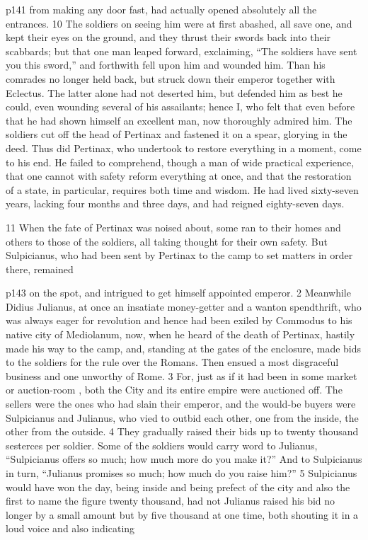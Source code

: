 p141 from making any door fast, had actually opened absolutely all the entrances.
10
The soldiers on seeing him were at first abashed, all save one, and kept their eyes on the ground, and they thrust their swords back into their scabbards; but that one man leaped forward, exclaiming, ``The soldiers have sent you this sword,'' and forthwith fell upon him and wounded him. Than his comrades no longer held back, but struck down their emperor together with Eclectus. The latter alone had not deserted him, but defended him as best he could, even wounding several of his assailants; hence I, who felt that even before that he had shown himself an excellent man, now thoroughly admired him. The soldiers cut off the head of Pertinax and fastened it on a spear, glorying in the deed. Thus did Pertinax, who undertook to restore everything in a moment, come to his end. He failed to comprehend, though a man of wide practical experience, that one cannot with safety reform everything at once, and that the restoration of a state, in particular, requires both time and wisdom. He had lived sixty-seven years, lacking four months and three days, and had reigned eighty-seven days.

11
When the fate of Pertinax was noised about, some ran to their homes and others to those of the soldiers, all taking thought for their own safety. But Sulpicianus, who had been sent by Pertinax to the camp to set matters in order there, remained

p143 on the spot, and intrigued to get himself appointed emperor. 2 Meanwhile Didius Julianus, at once an insatiate money-getter and a wanton spendthrift, who was always eager for revolution and hence had been exiled by Commodus to his native city of Mediolanum, now, when he heard of the death of Pertinax, hastily made his way to the camp, and, standing at the gates of the enclosure, made bids to the soldiers for the rule over the Romans. Then ensued a most disgraceful business and one unworthy of Rome. 3 For, just as if it had been in some market or auction-room , both the City and its entire empire were auctioned off. The sellers were the ones who had slain their emperor, and the would\texthebrew{‑}be buyers were Sulpicianus and Julianus, who vied to outbid each other, one from the inside, the other from the outside. 4 They gradually raised their bids up to twenty thousand sesterces per soldier. Some of the soldiers would carry word to Julianus, ``Sulpicianus offers so much; how much more do you make it?'' And to Sulpicianus in turn, ``Julianus promises so much; how much do you raise him?'' 5 Sulpicianus would have won the day, being inside and being prefect of the city and also the first to name the figure twenty thousand, had not Julianus raised his bid no longer by a small amount but by five thousand at one time, both shouting it in a loud voice and also indicating


